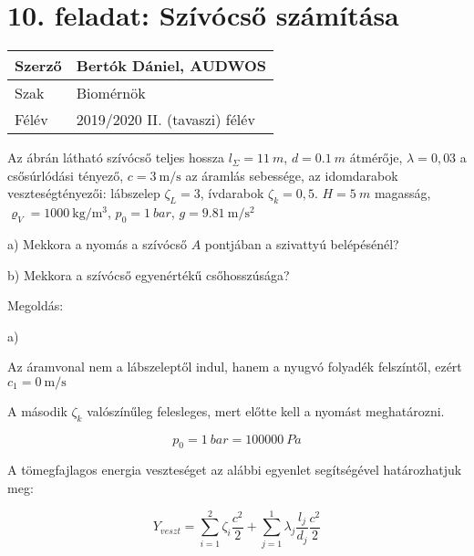 \section*{10. feladat: Szívócső számítása}




\begin{tabular}{ | p{2cm} | p{14cm} | } 
	\hline
	Szerző & Bertók Dániel, AUDWOS \\ 
	\hline
	Szak & Biomérnök \\ 
	\hline
	Félév & 2019/2020 II. (tavaszi) félév \\ 
	\hline
\end{tabular}
\vspace{0.5cm}


\noindent Az ábrán látható szívócső teljes hossza $l_\Sigma= \SI{11}{m}$,
$d= \SI{0,1}{m}$ átmérője,
$\lambda= 0,03$ a csősúrlódási tényező,
$c= \SI{3}{\meter\per\second}$ az áramlás sebessége,
az idomdarabok veszteségtényezői:
lábszelep $\zeta_L= 3$, ívdarabok $\zeta_k= 0,5$.
$H= \SI{5}{m}$ magasság,
$\varrho_V= \SI{1000}{\kilogram\per\meter\cubed}$,
$p_0= \SI{1}{bar}$,
$g= \SI{9,81}{\meter\per\second\squared}$ 


\noindent a) Mekkora a nyomás a szívócső $A$ pontjában a szivattyú belépésénél?

\noindent b) Mekkora a szívócső egyenértékű csőhosszúsága?





\noindent\hrulefill

\pagebreak
\noindent Megoldás:

\noindent a)

\noindent Az áramvonal nem a lábszeleptől indul, hanem a nyugvó folyadék felszíntől, ezért $c_1= \SI{0}{\meter\per\second}$

\noindent A második  $\zeta_k$ valószínűleg felesleges, mert előtte kell a nyomást meghatározni.

\begin{equation}
p_0=\SI{1}{bar}=\SI{100000}{Pa}
\end{equation}

A tömegfajlagos energia veszteséget az alábbi egyenlet segítségével határozhatjuk meg:

\begin{equation}
Y_{veszt}=\sum_{i=1}^2\zeta_i{\frac{c^2}{2}}+\sum_{j=1}^1\lambda_j{\frac{l_j}{d_j}}{\frac{c^2}{2}}
\end{equation}

